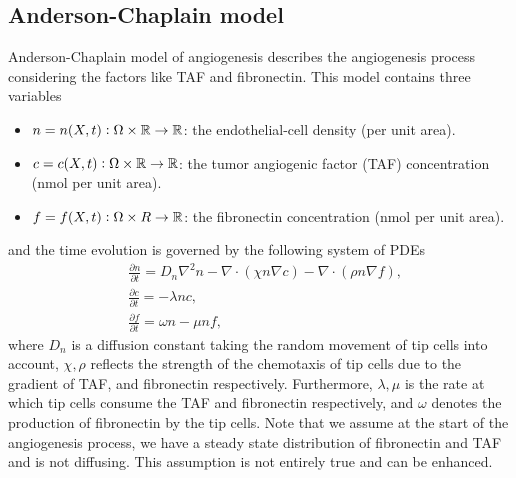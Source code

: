 \documentclass[10pt,a4paper,twocolumn]{article}
\begin{document}
	\subsection{Anderson-Chaplain model}
	Anderson-Chaplain model of angiogenesis \cite{Anderson1998} describes the angiogenesis process considering the factors like TAF and fibronectin. This model contains three variables
	\begin{itemize}[nosep]
		\item $ n = n(X,t): \Omega \times \mathbb{R} \to \mathbb{R} $: the endothelial-cell density (per unit area).
		\item $ c = c(X,t): \Omega \times \mathbb{R} \to \mathbb{R} $: the tumor angiogenic factor (TAF) concentration (nmol per unit area).
		\item $ f = f(X,t): \Omega \times R \to \mathbb{R} $: the fibronectin concentration (nmol per unit area).
	\end{itemize}
	and the time evolution is governed by the following system of PDEs
	\begin{align*}
		&\frac{\partial n}{\partial t} =  D_n\nabla^2 n  - \nabla\cdot(\chi n\nabla c) - \nabla\cdot(\rho n \nabla f), \\
		&\frac{\partial c}{\partial t} = -\lambda n c, \\
		&\frac{\partial f}{\partial t} = \omega n - \mu n f,
	\end{align*}
	where $ D_n $ is a diffusion constant taking the random movement of tip cells into account, $ \chi, \rho $ reflects the strength of the chemotaxis of tip cells due to the gradient of TAF, and fibronectin respectively. Furthermore, $ \lambda, \mu $ is the rate at which tip cells consume the TAF and fibronectin respectively, and $ \omega $ denotes the production of fibronectin by the tip cells. Note that we assume at the start of the angiogenesis process, we have a steady state distribution of fibronectin and TAF and is not diffusing. This assumption is not entirely true and can be enhanced.
	
\end{document}
